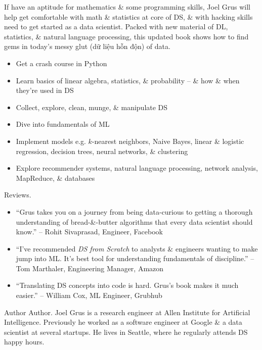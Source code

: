 \documentclass{article}
\begin{document}
If have an aptitude for mathematics \& some programming skills, {\sc Joel Grus} will help get comfortable with math \& statistics at core of DS, \& with hacking skills need to get started as a data scientist. Packed with new material of DL, statistics, \& natural language processing, this updated book shows how to find gems in today's messy glut (dữ liệu hỗn độn) of data.
\begin{itemize}
	\item Get a crash course in Python
	\item Learn basics of linear algebra, statistics, \& probability -- \& how \& when they're used in DS
	\item Collect, explore, clean, munge, \& manipulate DS
	\item Dive into fundamentals of ML
	\item Implement models e.g. $k$-nearest neighbors, Naive Bayes, linear \& logistic regression, decision trees, neural networks, \& clustering
	\item Explore recommender systems, natural language processing, network analysis, MapReduce, \& databases
\end{itemize}
{\sf Reviews.}
\begin{itemize}
	\item ``{\sc Grus} takes you on a journey from being data-curious to getting a thorough understanding of bread-\&-butter algorithms that every data scientist should know.'' -- {\sc Rohit Sivaprasad}, Engineer, Facebook
	\item ``I've recommended {\it DS from Scratch} to analysts \& engineers wanting to make jump into ML. It's best tool for understanding fundamentals of discipline.'' -- {\sc Tom Marthaler}, Engineering Manager, Amazon
	\item ``Translating DS concepts into code is hard. {\sc Grus}'s book makes it much easier.'' -- {\sc William Cox}, ML Engineer, Grubhub
\end{itemize}
{\sf Author Author.} {\sc Joel Grus} is a research engineer at Allen Institute for Artificial Intelligence. Previously he worked as a software engineer at Google \& a data scientist at several startups. He lives in Seattle, where he regularly attends DS happy hours.
\end{document}
